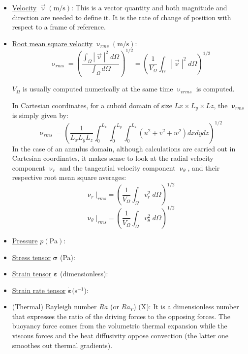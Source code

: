 \begin{itemize}
\item \underline{Velocity} $\vec \upnu (\text{m/s})$: This is a vector quantity and both magnitude and direction are needed to define it. It is the rate of change of position with respect to a frame of reference.
\item \underline{Root mean square velocity} $\upnu_{rms} (\text{m/s})$: 
\begin{equation}
\upnu_{rms} = \left ( \frac{\int_\Omega |{\vec \upnu}|^2 \;  d \Omega}{\int_\Omega d\Omega }  \right )^{1/2}
=\left ( \frac{1}{V_\Omega} \int_\Omega |{\vec \upnu}|^2 \;  d \Omega \right )^{1/2} \label{eqVrms}
\end{equation}
\begin{remark}
$V_\Omega$ is usually computed numerically at the same time $\upnu_{vrms}$ is computed.
\end{remark}
In Cartesian coordinates, for a cuboid domain of size $Lx\times L_y \times Lz$, 
the $\upnu_{rms}$ is simply given by:
\begin{equation}
\upnu_{rms}  = \left ( \frac{1}{L_xL_yL_z} \int_0^{L_x}\int_0^{L_y}\int_0^{L_z} 
(u^2 + v^2 + w^2) dxdydz  \right )^{1/2}
\end{equation}
In the case of an annulus domain, although calculations are carried out 
in Cartesian coordinates, it makes sense
to look at the radial velocity component $\upnu_r$ and the tangential velocity 
component $\upnu_\theta$, and their respective
root mean square averages:
\begin{equation}
\upnu_r|_{rms}  =\left ( \frac{1}{V_\Omega} \int_\Omega v_r^2 \;  d \Omega \right )^{1/2} \label{eqVrVrms}
\end{equation}
\begin{equation}
\upnu_\theta|_{rms}  = \left ( \frac{1}{V_\Omega} \int_\Omega v_\theta^2 \;  d \Omega \right )^{1/2} \label{eqThetaVrms}
\end{equation}


\item \underline{Pressure} $p (\text{Pa})$:
\item \underline{Stress tensor} ${\bm \sigma}$ (Pa): 
\item \underline{Strain tensor} ${\bm \varepsilon}$ (dimensionless): 
\item \underline{Strain rate tensor} $ \dot{\bm \varepsilon} (\text{s}^{-1}$): 

\item \underline{(Thermal) Rayleigh number} $Ra$ (or $Ra_T$) (X): 
It is a dimensionless number that expresses the	ratio of the driving forces to the opposing forces.
The buoyancy force comes from the volumetric thermal expansion while the viscous forces and 
the heat diffusivity oppose convection (the latter one smoothes out thermal gradients). 


\end{itemize}
